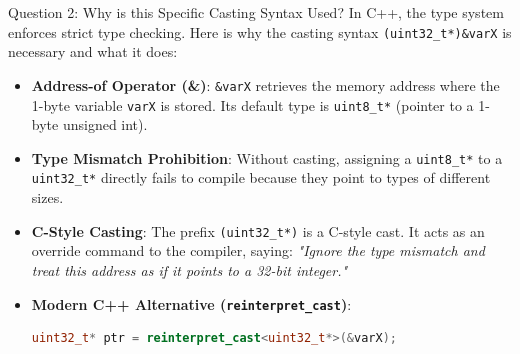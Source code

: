 \documentclass[11pt,a4paper]{article}
\begin{document}
\begin{explanationbox}{Question 2: Why is this Specific Casting Syntax Used?}
    In C++, the type system enforces strict type checking. Here is why the casting syntax \texttt{(uint32\_t*)\&varX} is necessary and what it does:
    \begin{itemize}
        \item \textbf{Address-of Operator (\&)}: \texttt{\&varX} retrieves the memory address where the 1-byte variable \texttt{varX} is stored. Its default type is \texttt{uint8\_t*} (pointer to a 1-byte unsigned int).
        \item \textbf{Type Mismatch Prohibition}: Without casting, assigning a \texttt{uint8\_t*} to a \texttt{uint32\_t*} directly fails to compile because they point to types of different sizes.
        \item \textbf{C-Style Casting}: The prefix \texttt{(uint32\_t*)} is a C-style cast. It acts as an override command to the compiler, saying: \textit{"Ignore the type mismatch and treat this address as if it points to a 32-bit integer."}
        \item \textbf{Modern C++ Alternative (\texttt{reinterpret\_cast})}:
        \begin{lstlisting}[language=C++]
uint32_t* ptr = reinterpret_cast<uint32_t*>(&varX);
        \end{lstlisting}
    \end{itemize}


\end{explanationbox}
\end{document}
